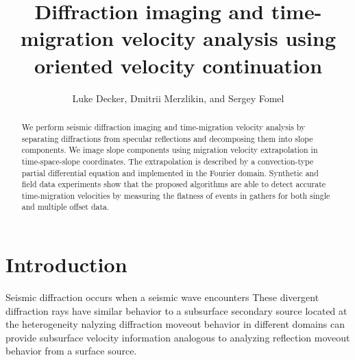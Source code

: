 
\title{Diffraction imaging and time-migration velocity analysis using oriented velocity continuation}

\author{Luke Decker, Dmitrii Merzlikin, and Sergey Fomel}

\maketitle

\address{
Bureau of Economic Geology, \\
Jackson School of Geosciences \\
The University of Texas at Austin \\
University Station, Box X \\
Austin, TX 78713-8924}

\begin{abstract}
We perform seismic diffraction imaging and time-migration velocity analysis by
separating diffractions from specular reflections and decomposing them
into slope components. We image slope components using migration velocity extrapolation in time-space-slope coordinates. The
extrapolation is described by a convection-type partial differential
equation and implemented  in the Fourier domain. Synthetic
and field data experiments show that the proposed algorithms are able to
detect accurate time-migration velocities by measuring
the flatness of events in  gathers for both single and multiple offset data.
\end{abstract}

\section{Introduction}

Seismic diffraction occurs when a seismic wave encounters   These divergent diffraction
rays have similar behavior to a subsurface secondary source located at the 
heterogeneity \cite[]{keller}nalyzing diffraction moveout behavior
in different domains can provide subsurface velocity information analogous 
to analyzing reflection moveout behavior from a surface source.

